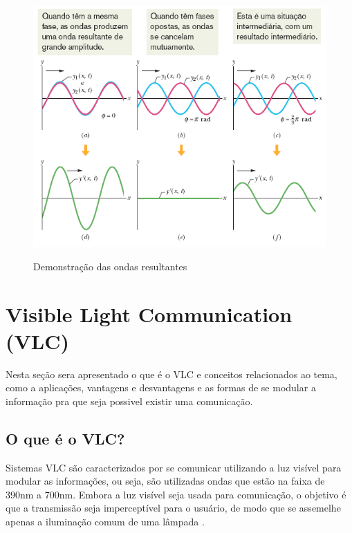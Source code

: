 \begin{figure}[!htbp]
  \caption{Demonstração das ondas resultantes}
  \includegraphics[scale=0.5]{images/ondas_interferencia.png}
  \label{fig:ondas_inter}
\end{figure}


\section{Visible Light Communication (VLC)}

Nesta seção sera apresentado o que é o VLC e conceitos relacionados ao tema, como a aplicações, vantagens e desvantagens e as formas de se modular a informação pra que seja possivel existir uma comunicação.

\subsection{O que é o VLC?}

Sistemas VLC são caracterizados por se comunicar utilizando a luz visível para modular as informações, ou seja, são utilizadas ondas que estão na faixa de 390nm a 700nm. Embora a luz visível seja usada para comunicação, o objetivo é que a transmissão seja imperceptível para o usuário, de modo que se assemelhe apenas a iluminação comum de uma lâmpada \cite{matheus2017comunicaccao}.

